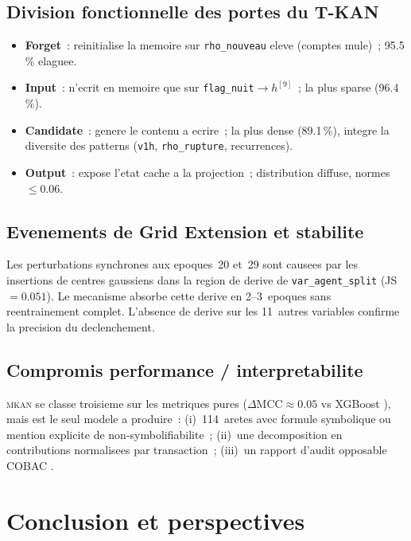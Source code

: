 \documentclass[11pt,a4paper,twocolumn]{article}
\newcommand{\MKAN}{\textsc{mkan}}
\begin{document}
\subsection{Division fonctionnelle des portes du T-KAN}

\begin{itemize}
  \item \textbf{Forget}~: reinitialise la memoire sur \texttt{rho\_nouveau}
        eleve (comptes mule)~; 95.5\,\% elaguee.
  \item \textbf{Input}~: n'ecrit en memoire que sur
        \texttt{flag\_nuit}$\to h^{[9]}$~;
        la plus sparse (96.4\,\%).
  \item \textbf{Candidate}~: genere le contenu a ecrire~;
        la plus dense (89.1\,\%), integre la diversite des
        patterns (\texttt{v1h}, \texttt{rho\_rupture}, recurrences).
  \item \textbf{Output}~: expose l'etat cache a la projection~;
        distribution diffuse, normes $\leq 0.06$.
\end{itemize}

\subsection{Evenements de Grid Extension et stabilite}

Les perturbations synchrones aux epoques~20 et~29 sont causees par
les insertions de centres gaussiens dans la region de derive de
\texttt{var\_agent\_split} (JS$=0.051$). Le mecanisme absorbe cette
derive en 2--3~epoques sans reentrainement complet. L'absence de
derive sur les 11~autres variables confirme la precision du declenchement.

\subsection{Compromis performance / interpretabilite}

\MKAN{} se classe troisieme sur les metriques pures
($\Delta\text{MCC}\approx0.05$ vs XGBoost \cite{chen2016xgboost}),
mais est le seul modele a produire~: (i)~114~aretes avec formule
symbolique ou mention explicite de non-symbolifiabilite~;
(ii)~une decomposition en contributions normalisees par transaction~;
(iii)~un rapport d'audit opposable COBAC \cite{cobac2018}.

\section{Conclusion et perspectives}
\end{document}
